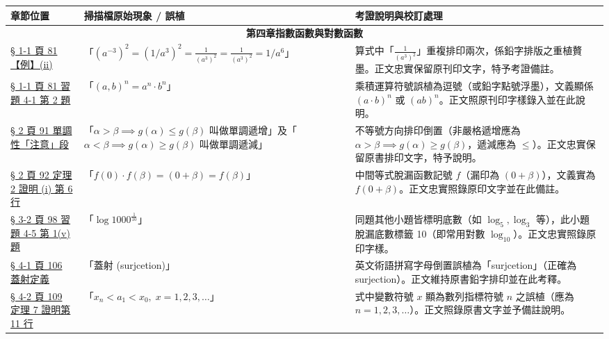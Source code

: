 \documentclass[a4paper,12pt,twoside]{article}
\begin{document}
\begin{table}[H]
\centering
\small
\renewcommand{\arraystretch}{1.35}
\begin{tabularx}{\textwidth}{|p{3.0cm}|p{3.8cm}|X|}
\hline
\textbf{章節位置} & \textbf{掃描檔原始現象 / 誤植} & \textbf{考證說明與校訂處理} \\ \hline

\multicolumn{3}{|c|}{\textbf{第四章\quad 指數函數與對數函數}} \\ \hline

\hyperref[note:b2-ch4-p81-duplicate]{§ 1-1 頁 81 【例】(ii)} & 
「$(a^{-3})^2 = (1/a^3)^2 = \frac{1}{(a^3)^2} = \frac{1}{(a^3)^2} = 1/a^6$」 & 
算式中「$\frac{1}{(a^3)^2}$」重複排印兩次，係鉛字排版之重植贅墨。正文忠實保留原刊印文字，特予考證備註。 \\ \hline

\hyperref[note:b2-ch4-p81-comma]{§ 1-1 頁 81 習題 4-1 第 2 題} & 
「$(a, b)^n = a^n \cdot b^n$」 & 
乘積運算符號誤植為逗號（或鉛字點號浮墨），文義顯係 $(a\cdot b)^n$ 或 $(ab)^n$。正文照原刊印字樣錄入並在此說明。 \\ \hline

\hyperref[note:b2-ch4-p91-monotonicity]{§ 2 頁 91 單調性「注意」段} & 
「$\alpha > \beta \implies g(\alpha) \le g(\beta)$ 叫做單調遞增」及「$\alpha < \beta \implies g(\alpha) \ge g(\beta)$ 叫做單調遞減」 & 
不等號方向排印倒置（非嚴格遞增應為 $\alpha > \beta \implies g(\alpha) \ge g(\beta)$，遞減應為 $\le$）。正文忠實保留原書排印文字，特予說明。 \\ \hline

\hyperref[note:b2-ch4-p92-missing-f]{§ 2 頁 92 定理 2 證明 (i) 第 6 行} & 
「$f(0)\cdot f(\beta) = (0+\beta) = f(\beta)$」 & 
中間等式脫漏函數記號 $f$（漏印為 $(0+\beta)$），文義實為 $f(0+\beta)$。正文忠實照錄原印文字並在此備註。 \\ \hline

\hyperref[note:b2-ch4-p98-log-base]{§ 3-2 頁 98 習題 4-5 第 1(v) 題} & 
「$\log 1000^{\frac{1}{10}}$」 & 
同題其他小題皆標明底數（如 $\log_5, \log_3$ 等），此小題脫漏底數標籤 10（即常用對數 $\log_{10}$）。正文忠實照錄原印字樣。 \\ \hline

\hyperref[note:b2-ch4-p106-surjcetion]{§ 4-1 頁 106 蓋射定義} & 
「蓋射 (surjcetion)」 & 
英文術語拼寫字母倒置誤植為「surjcetion」（正確為 surjection）。正文維持原書鉛字排印並在此考釋。 \\ \hline

\hyperref[note:b2-ch4-p109-index-x]{§ 4-2 頁 109 定理 7 證明第 11 行} & 
「$x_n < a_1 < x_0,\; x = 1, 2, 3, \dots$」 & 
式中變數符號 $x$ 顯為數列指標符號 $n$ 之誤植（應為 $n = 1, 2, 3, \dots$）。正文照錄原書文字並予備註說明。 \\ \hline

\end{tabularx}
\end{table}
\end{document}

